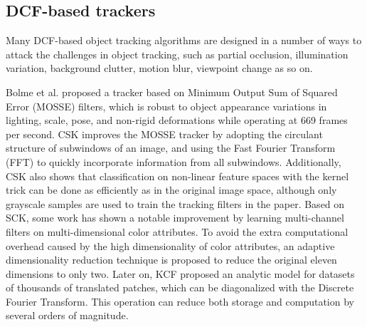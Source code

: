 \documentclass[review]{elsarticle}
\newcommand{\HL}[1]{\textcolor[rgb]{1.00,0.00,0.00}{#1}}
\begin{document}
\begin{CJK*}{UTF8}{gbsn}
\subsection{DCF-based trackers}
Many DCF-based object tracking algorithms are designed \HL{in a number of ways} to \HL{attack} the challenges in object tracking, such as partial occlusion, illumination variation, background clutter, motion blur, viewpoint change as so on.

\HL{Bolme et al. proposed a tracker \cite{Bolme2010VisualOT}} based on Minimum Output Sum of Squared Error (MOSSE) filters, which is robust to \HL{object appearance variations} in lighting, scale, pose, and non-rigid deformations while operating at 669 frames per second.
CSK \cite{Henriques2012ExploitingTC} improves the MOSSE \HL{tracker} by adopting the circulant structure of subwindows of an image, \HL{and using} the Fast Fourier Transform (FFT) to quickly incorporate information from all subwindows. Additionally, CSK also shows that classification on non-linear feature spaces with the \HL{kernel trick} can be done as efficiently as in the original image space, \HL{although only grayscale samples are used to train the tracking filters in the paper.}
Based on SCK, \HL{some work} \cite{Danelljan2014AdaptiveCA} has shown a notable improvement by learning multi-channel filters on multi-dimensional color attributes. To avoid the extra computational overhead caused by the high dimensionality of color attributes,  \HL{an adaptive dimensionality reduction technique is proposed \cite{Danelljan2014AdaptiveCA} to reduce} the original eleven dimensions to only two.
\HL{Later on, }KCF \cite{Henriques2015HighSpeedTW} proposed an analytic model for datasets of thousands of translated patches, which can be diagonalized with the Discrete Fourier Transform. This operation can reduce both storage and computation by several orders of magnitude.


\end{CJK*}
\end{document}
